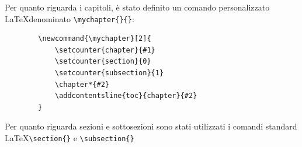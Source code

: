 \documentclass[a4paper]{report}
\newcommand{\mychapter}[2]{
	\setcounter{chapter}{#1}
	\setcounter{section}{0}
	\setcounter{subsection}{1}
	\chapter*{#2}
	\addcontentsline{toc}{chapter}{#2}
}
\begin{document}
	Per quanto riguarda i capitoli, è stato definito un comando personalizzato \LaTeX \space denominato
	\verb|\mychapter{}{}|:
	\begin{verbatim}
		\newcommand{\mychapter}[2]{
			\setcounter{chapter}{#1}
			\setcounter{section}{0}
			\setcounter{subsection}{1}
			\chapter*{#2}
			\addcontentsline{toc}{chapter}{#2}
		}
	\end{verbatim}
	Per quanto riguarda sezioni e sottosezioni sono stati utilizzati i comandi standard \LaTeX \verb|\section{}| e
	\verb|\subsection{}| 
\end{document}
